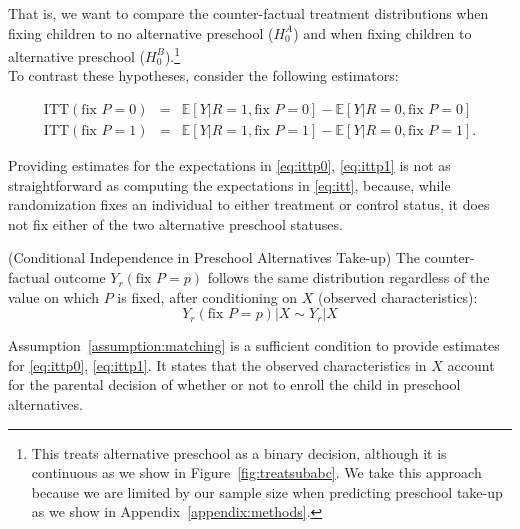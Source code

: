 \noindent That is, we want to compare the counter-factual treatment distributions when fixing children to no alternative preschool ($H_{0}^A$) and when fixing children to alternative preschool ($H_{0}^B$).\footnote{This treats alternative preschool as a binary decision, although it is continuous as we show in Figure~\ref{fig:treatsubabc}. We take this approach because we are limited by our sample size when predicting preschool take-up as we show in Appendix~\ref{appendix:methods}.}\\

\noindent To contrast these hypotheses, consider the following estimators: 

\begin{eqnarray}
\text{ITT} \left( \text{fix } P = 0 \right) &=& \mathbb{E} \left[ Y | R = 1, \text{fix } P = 0 \right] - \mathbb{E} \left[ Y | R = 0, \text{fix } P = 0 \right] \label{eq:ittp0} \\
\text{ITT} \left( \text{fix } P = 1 \right) &=& \mathbb{E} \left[ Y | R = 1, \text{fix } P = 1 \right] - \mathbb{E} \left[ Y | R = 0, \text{fix } P = 1 \right]. \label{eq:ittp1}  
\end{eqnarray}

\noindent Providing estimates for the expectations in \eqref{eq:ittp0}, \eqref{eq:ittp1} is not as straightforward as computing the expectations in \eqref{eq:itt}, because, while randomization fixes an individual to either treatment or control status, it does not fix either of the two alternative preschool statuses.\\

\begin{assumption} \normalfont \label{assumption:matching} (Conditional Independence in Preschool Alternatives Take-up) The counter-factual outcome $Y_{r} \left( \text{fix } P=p \right)$ follows the same distribution regardless of the value on which $P$ is fixed, after conditioning on $X$ (observed characteristics): 
\begin{equation}
Y_{r} \left( \text{fix } P=p \right) | X \sim Y_{r}  | X 
\end{equation}
 \end{assumption}

\noindent Assumption~\ref{assumption:matching} is a sufficient condition to provide estimates for \eqref{eq:ittp0}, \eqref{eq:ittp1}.  It states that the observed characteristics in $X$ account for the parental decision of whether or not to enroll the child in preschool alternatives.\\

